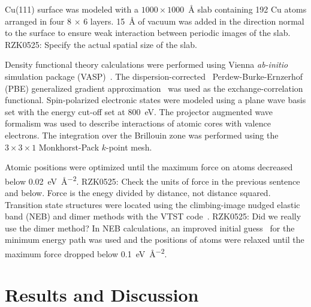\documentclass[%
 reprint,
 amsmath,amssymb,
 aps,
prb,
floatfix,
]{revtex4-2}
\newcommand{\lock}{\color{red}}
\newcommand{\lock}{\color{red}}
\newcommand{\comm}{\color{Purple}} %
\begin{document}
{\lock

Cu(111) surface was modeled with a $1000 \times 1000$~\si{\angstrom} slab containing 192 Cu atoms arranged in four 8 $\times$ 6 layers. \SI{15}{\angstrom} of vacuum was added in the direction normal to the surface to ensure weak interaction between periodic images of the slab. {\comm RZK0525: Specify the actual spatial size of the slab.}

Density functional theory calculations were performed using Vienna \emph{ab-initio} simulation package (VASP)~\cite{RZK}. The dispersion-corrected~\cite{RZK-DFT-D3} Perdew-Burke-Ernzerhof (PBE) generalized gradient approximation~\cite{RZK} was used as the exchange-correlation functional. Spin-polarized electronic states were modeled using a plane wave basis set with the energy cut-off set at \SI{800}{\electronvolt}. The projector augmented wave formalism was used to describe interactions of atomic cores with valence electrons. The integration over the Brillouin zone was performed using the $3\times 3 \times1$ Monkhorst-Pack $k$-point mesh. 

Atomic positions were optimized until the maximum force on atoms decreased below \SI{0.02}{\electronvolt\per\square\angstrom}. 
{\comm RZK0525: Check the units of force in the previous sentence and below. Force is the enegy divided by distance, not distance squared.}
%
Transition state structures were located using the climbing-image nudged elastic band (NEB) and dimer methods with the VTST code~\cite{ullmann_59}. {\comm RZK0525: Did we really use the dimer method?}
%
In NEB calculations, an improved initial guess~\cite{ullmann_60, ullmann_99} for the minimum energy path was used and the positions of atoms were relaxed until the maximum force dropped below \SI{0.1}{\electronvolt\per\square\angstrom}.


}

\section{Results and Discussion}

\end{document}
